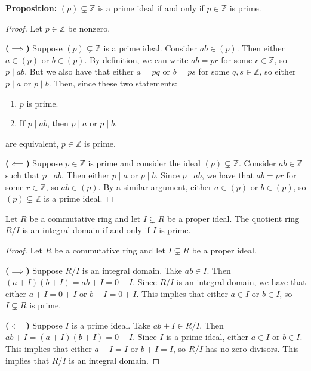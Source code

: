 \documentclass [12pt] {article}
\newcommand{\Z}{\mathbb{Z}}
\newenvironment{theorem}[1]{\begin{tcolorbox}[title={Theorem #1},colback=green!5!white,colframe=black!75!green]}{\end{tcolorbox}}
\renewcommand{\bf}[1]{\textbf{{#1}}}
\begin{document}
\bf{Proposition:} $(p) \subsetneq \Z$ is a prime ideal if and only if $p \in \Z$ is prime.
\begin{proof}
    Let $p \in \Z$ be nonzero.
    \vspace{0.5em}

    \bf{($\bm{\implies}$)}
    Suppose $(p) \subsetneq \Z$ is a prime ideal. Consider $ab \in (p)$. Then either $a \in (p)$ or
    $b \in (p)$. By definition, we can write $ab = pr$ for some $r \in \Z$, so $p \mid ab$. But we
    also have that either $a = pq$ or $b = ps$ for some $q, s \in \Z$, so either $p \mid a$ or
    $p \mid b$. Then, since these two statements:
    \begin{enumerate}[label=(\arabic*)]
        \item $p$ is prime.
        \item If $p \mid ab$, then $p \mid a$ or $p \mid b$.
    \end{enumerate}
    are equivalent, $p \in \Z$ is prime.
    \vspace{0.5em}

    \bf{($\bm{\impliedby}$)}
    Suppose $p \in \Z$ is prime and consider the ideal $(p) \subsetneq \Z$. Consider $ab \in \Z$
    such that $p \mid ab$. Then either $p \mid a$ or $p \mid b$. Since $p \mid ab$, we have that
    $ab = pr$ for some $r \in \Z$, so $ab \in (p)$. By a similar argument, either $a \in (p)$ or
    $b \in (p)$, so $(p) \subsetneq \Z$ is a prime ideal.
\end{proof}

\begin{theorem}{}
    Let $R$ be a commutative ring and let $I \subsetneq R$ be a proper ideal. The quotient ring
    $R/I$ is an integral domain if and only if $I$ is prime.
\end{theorem}
\begin{proof}
    Let $R$ be a commutative ring and let $I \subsetneq R$ be a proper ideal.
    \vspace{0.5em}

    \bf{($\bm{\implies}$)}
    Suppose $R/I$ is an integral domain. Take $ab \in I$. Then $(a + I)(b + I) = ab + I = 0 + I$.
    Since $R/I$ is an integral domain, we have that either $a + I = 0 + I$ or $b + I = 0 + I$. This
    implies that either $a \in I$ or $b \in I$, so $I \subsetneq R$ is prime.
    \vspace{0.5em}

    \bf{($\bm{\impliedby}$)}
    Suppose $I$ is a prime ideal. Take $ab + I \in R/I$. Then $ab + I = (a + I)(b + I) = 0 + I$.
    Since $I$ is a prime ideal, either $a \in I$ or $b \in I$. This implies that either $a + I = I$ or
    $b + I = I$, so $R/I$ has no zero divisors. This implies that $R/I$ is an integral domain.
\end{proof}
\end{document}
